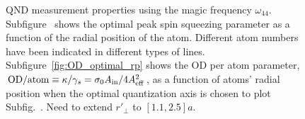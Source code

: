 \documentclass[preprint,aps,pra,onecolumn]{revtex4-1} %
\newcommand{\comment}[1]{{\color{Maroon} #1}}
\begin{document}
\begin{figure}
\begin{minipage}{.49\linewidth}
\centering
{}
\end{minipage}
\begin{minipage}{.49\linewidth}
\centering
{}
\end{minipage}
\caption{QND measurement properties using the magic frequency $ \omega_{44} $. Subfigure~\protect{} shows the optimal peak spin squeezing parameter as a function of the radial position of the atom. Different atom numbers have been indicated in different types of lines. Subfigure~\ref{fig:OD_optimal_rp} shows the OD per atom parameter, $ \mathrm{OD}/{\mathrm{atom}}\equiv \kappa/\gamma_s= \sigma_0A_{\rm in}/4A_{\rm eff}^2 $, as a function of atoms' radial position when the optimal quantization axis is chosen to plot Subfig.~\protect{}. \comment{Need to extend $ r'\!_\perp $ to $ [1.1,2.5]a $.}}\label{fig:QNDproperty_magic44}
\end{figure}
\end{document}
